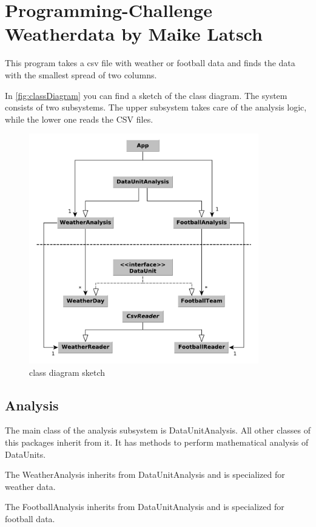 \documentclass{article}
\begin{document}
	\section*{Programming-Challenge Weatherdata by Maike Latsch}
	
	This program takes a csv file with weather or football data and finds the data with the smallest spread of two columns.
	
	In \autoref{fig:classDiagram} you can find a sketch of the class diagram. The system consists of two subsystems. The upper subsystem takes care of the analysis logic, while the lower one reads the CSV files.

	\begin{figure}[h]
		\centering      
		\includegraphics[width=10cm]{graphics/challenge-weatherdata.pdf}      
		\caption{class diagram sketch}
		\label{fig:classDiagram}
	\end{figure}
	
	\subsection*{Analysis}
	
	The main class of the analysis subsystem is DataUnitAnalysis. All other classes of this packages inherit from it. It has methods to perform mathematical analysis of DataUnits.
	
	The WeatherAnalysis inherits from DataUnitAnalysis and is specialized for weather data.
	
	The FootballAnalysis inherits from DataUnitAnalysis and is specialized for football data.
	
\end{document}
